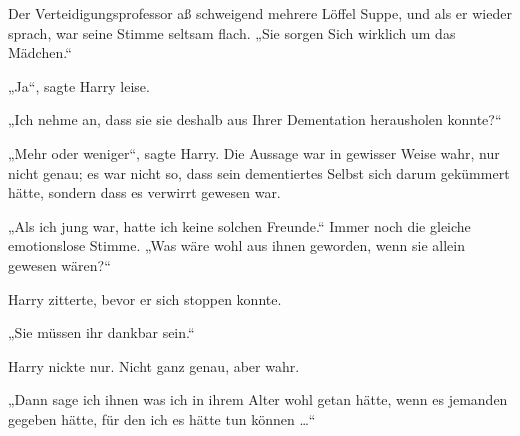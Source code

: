 Der Verteidigungsprofessor aß schweigend mehrere Löffel Suppe, und als er wieder sprach, war seine Stimme seltsam flach.
„Sie sorgen Sich wirklich um das Mädchen.“

„Ja“, sagte Harry leise.

„Ich nehme an, dass sie sie deshalb aus Ihrer Dementation herausholen konnte?“

„Mehr oder weniger“, sagte Harry. Die Aussage war in gewisser Weise wahr, nur nicht genau; es war nicht so, dass sein dementiertes Selbst sich darum gekümmert hätte, sondern dass es verwirrt gewesen war.

„Als ich jung war, hatte ich keine solchen Freunde.“ Immer noch die gleiche emotionslose Stimme.
„Was wäre wohl aus ihnen geworden, wenn sie allein gewesen wären?“

Harry zitterte, bevor er sich stoppen konnte.

„Sie müssen ihr dankbar sein.“

Harry nickte nur. Nicht ganz genau, aber wahr.

„Dann sage ich ihnen was ich in ihrem Alter wohl getan hätte, wenn es jemanden gegeben hätte, für den ich es hätte tun können …“

